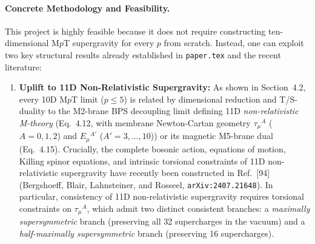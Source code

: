 \documentclass[11pt,a4paper]{article}
\begin{document}
\paragraph{Concrete Methodology and Feasibility.}
This project is highly feasible because it does not require constructing ten-dimensional M$p$T supergravity for every $p$ from scratch. Instead, one can exploit two key structural results already established in \texttt{paper.tex} and the recent literature:
\begin{enumerate}[label=(\roman*), leftmargin=1.8em]
    \item \textbf{Uplift to 11D Non-Relativistic Supergravity:}
    As shown in Section~4.2, every 10D M$p$T limit ($p \le 5$) is related by dimensional reduction and T/S-duality to the M2-brane BPS decoupling limit defining 11D \emph{non-relativistic M-theory} (Eq.~4.12, with membrane Newton-Cartan geometry $\tau_\mu{}^A$ ($A=0,1,2$) and $E_\mu{}^{A'}$ ($A'=3,\dots,10$)) or its magnetic M5-brane dual (Eq.~4.15). Crucially, the complete bosonic action, equations of motion, Killing spinor equations, and intrinsic torsional constraints of 11D non-relativistic supergravity have recently been constructed in Ref.~[94] (Bergshoeff, Blair, Lahnsteiner, and Rosseel, \texttt{arXiv:2407.21648}). In particular, consistency of 11D non-relativistic supergravity requires torsional constraints on $\tau_\mu{}^A$, which admit two distinct consistent branches: a \emph{maximally supersymmetric} branch (preserving all 32 supercharges in the vacuum) and a \emph{half-maximally supersymmetric} branch (preserving 16 supercharges).


\end{enumerate}
\end{document}
